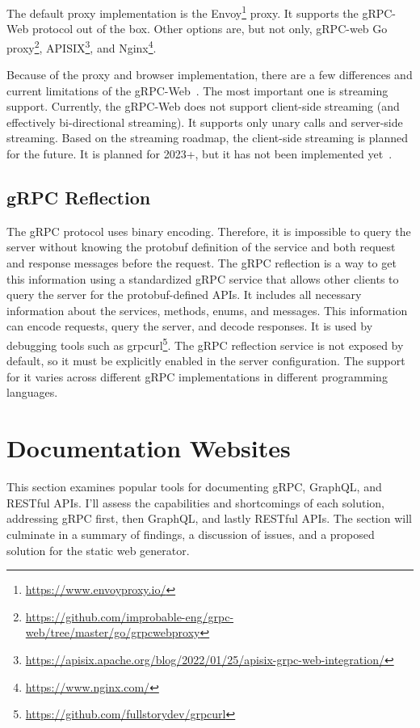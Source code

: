 The default proxy implementation is the Envoy\footnote{\url{https://www.envoyproxy.io/}} proxy.
It supports the gRPC-Web protocol out of the box.
Other options are, but not only, gRPC-web Go proxy\footnote{\url{https://github.com/improbable-eng/grpc-web/tree/master/go/grpcwebproxy}}, APISIX\footnote{\url{https://apisix.apache.org/blog/2022/01/25/apisix-grpc-web-integration/}}, and Nginx\footnote{\url{https://www.nginx.com/}}.

Because of the proxy and browser implementation, there are a few differences and current limitations of the gRPC-Web~\cite{grpc-web}.
The most important one is streaming support.
Currently, the gRPC-Web does not support client-side streaming (and effectively bi-directional streaming).
It supports only unary calls and server-side streaming.
Based on the streaming roadmap, the client-side streaming is planned for the future.
It is planned for 2023+, but it has not been implemented yet~\cite{grpc-web-streaming-roadmap}.

\subsection{gRPC Reflection}
The gRPC protocol uses binary encoding.
Therefore, it is impossible to query the server without knowing the protobuf definition of the service and both request and response messages before the request.
The gRPC reflection is a way to get this information using a standardized gRPC service that allows other clients to query the server for the protobuf-defined APIs.
It includes all necessary information about the services, methods, enums, and messages.
This information can encode requests, query the server, and decode responses.
It is used by debugging tools such as grpcurl\footnote{\url{https://github.com/fullstorydev/grpcurl}}.
The gRPC reflection service is not exposed by default, so it must be explicitly enabled in the server configuration.
The support for it varies across different gRPC implementations in different programming languages.
\cite{grpc-reflection}


\section{Documentation Websites}
This section examines popular tools for documenting gRPC, GraphQL, and RESTful APIs.
I'll assess the capabilities and shortcomings of each solution, addressing gRPC first, then GraphQL, and lastly RESTful APIs.
The section will culminate in a summary of findings, a discussion of issues, and a proposed solution for the static web generator.

